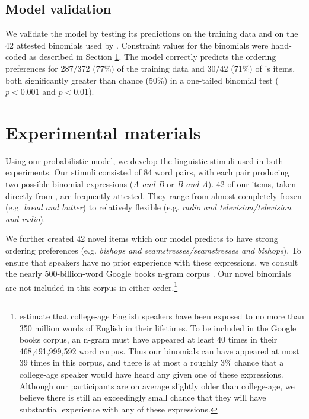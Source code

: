 \documentclass[authoryear]{elsarticle}
\begin{document}
\subsection{Model validation}\label{validation}
We validate the model by testing its predictions on the training data and on the 42 attested binomials used by \citet{SiyanovaChanturia:2011ep}. Constraint values for the \citeauthor{SiyanovaChanturia:2011ep} binomials were hand-coded as described in Section \ref{materials}. The model correctly predicts the ordering preferences for 287/372 (77\%) of the training data and 30/42 (71\%) of \citeauthor{SiyanovaChanturia:2011ep}'s items, both significantly greater than chance (50\%) in a one-tailed binomial test ($p < 0.001$ and $p < 0.01$).


\section{Experimental materials}\label{materials}
Using our probabilistic model, we develop the linguistic stimuli used in both experiments. Our stimuli consisted of 84 word pairs, with each pair producing two possible binomial expressions (\emph{A and B} or \emph{B and A}). 42 of our items, taken directly from \citet{SiyanovaChanturia:2011ep}, are frequently attested. They range from almost completely frozen (e.g. \emph{bread and butter}) to relatively flexible (e.g. \emph{radio and television/television and radio}).

We further created 42 novel items which our model predicts to have strong ordering preferences (e.g. \emph{bishops and seamstresses/seamstresses and bishops}). To ensure that speakers have no prior experience with these expressions, we consult the nearly 500-billion-word Google books n-gram corpus \citep{Lin:2012te}. Our novel binomials are not included in this corpus in either order.\footnote{\citet{Levy:2012bj} estimate that college-age English speakers have been exposed to no more than 350 million words of English in their lifetimes. To be included in the Google books corpus, an n-gram must have appeared at least 40 times in their 468,491,999,592 word corpus. Thus our binomials can have appeared at most 39 times in this corpus, and there is at most a roughly 3\% chance that a college-age speaker would have heard any given one of these expressions. Although our participants are on average slightly older than college-age, we believe there is still an exceedingly small chance that they will have substantial experience with any of these expressions.} 
\end{document}
